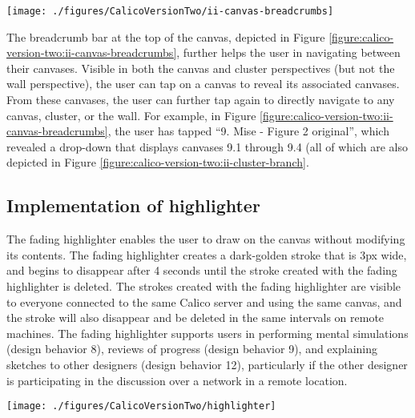 \begin{figure*}[tbh]
  \centering
  \texttt{[image: ./figures/CalicoVersionTwo/ii-canvas-breadcrumbs]}
  \caption{The breadcrumb bar in the upper-left enables users to navigate between canvases without using the wall or cluster perspectives.}
  \label{figure:calico-version-two:ii-canvas-breadcrumbs}
\end{figure*}

The breadcrumb bar at the top of the canvas, depicted in Figure \ref{figure:calico-version-two:ii-canvas-breadcrumbs}, further helps the user in navigating between their canvases. Visible in both the canvas and cluster perspectives (but not the wall perspective), the user can tap on a canvas to reveal its associated canvases. From these canvases, the user can further tap again to directly navigate to any canvas, cluster, or the wall. For example, in Figure \ref{figure:calico-version-two:ii-canvas-breadcrumbs}, the user has tapped ``9. Mise - Figure 2 original'', which revealed a drop-down that displays canvases 9.1 through 9.4 (all of which are also depicted in Figure \ref{figure:calico-version-two:ii-cluster-branch}.

\subsection{Implementation of highlighter}

The fading highlighter enables the user to draw on the canvas without modifying its contents. The fading highlighter creates a dark-golden stroke that is 3px wide, and begins to disappear after 4 seconds until the stroke created with the fading highlighter is deleted. The strokes created with the fading highlighter are visible to everyone connected to the same Calico server and using the same canvas, and the stroke will also disappear and be deleted in the same intervals on remote machines. The fading highlighter supports users in performing mental simulations (design behavior 8), reviews of progress (design behavior 9), and explaining sketches to other designers (design behavior 12), particularly if the other designer is participating in the discussion over a network in a remote location.

\begin{figure*}[tbh]
  \centering
  \texttt{[image: ./figures/CalicoVersionTwo/highlighter]}
  \caption{Highlighter}
  \label{figure:calico-version-two:highlighter}
\end{figure*}

